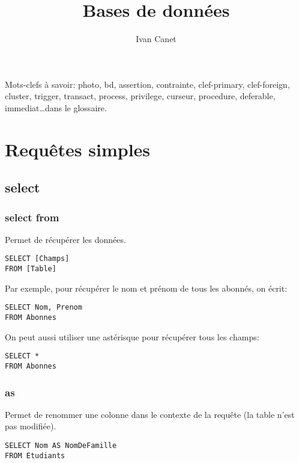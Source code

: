 \documentclass[10pt,a4paper,french]{article}
\begin{document}
\title{Bases de données}
\author{Ivan Canet}
\maketitle


\tableofcontents

Mots-clefs à savoir: \gls{photo}, \gls{bd}, \gls{assertion}, \gls{contrainte}, \gls{clef-primary}, \gls{clef-foreign}, \gls{cluster}, \gls{trigger}, \gls{transact}, \gls{process}, \gls{privilege}, \gls{curseur}, \gls{procedure}, \gls{deferable}, \gls{immediat}\ldots dans le glossaire.

\section{Requêtes simples}

\subsection{\gls{select}}

\subsubsection{\gls{select} \gls{from}}

Permet de récupérer les données.
\begin{verbatim}
SELECT [Champs]
FROM [Table]
\end{verbatim}

Par exemple, pour récupérer le nom et prénom de tous les abonnés, on écrit:
\begin{verbatim}
SELECT Nom, Prenom
FROM Abonnes
\end{verbatim}

On peut aussi utiliser une astérisque pour récupérer tous les champs:
\begin{verbatim}
SELECT *
FROM Abonnes
\end{verbatim}

\subsubsection{\gls{as}}

Permet de renommer une colonne dans le contexte de la requête (la table n'est pas modifiée).
\begin{verbatim}
SELECT Nom AS NomDeFamille
FROM Etudiants
\end{verbatim}
\end{document}

